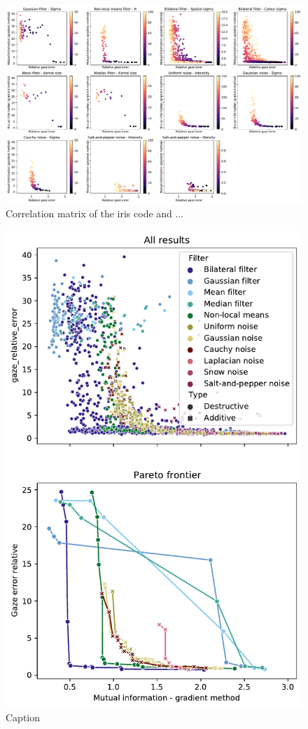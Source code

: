 \begin{figure}
    \centering
    \includegraphics[width=1\textwidth]{figures/parameters.pdf}
    \caption{Correlation matrix of the iris code and ...}
    \label{fig:parameters}
\end{figure}

\begin{figure}
    \centering
    \includegraphics[width=1\linewidth]{figures/performance.pdf}
    \caption{Caption}
    \label{fig:performance}
\end{figure}

